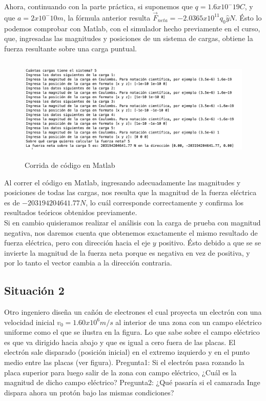 \documentclass[12pt, letterpaper]{report}
\begin{document}
Ahora, continuando con la parte práctica, si suponemos que $q = 1.6x10^-19 C$, y que $a = 2x10^-10m$, la fórmula anterior resulta $\vec{F}_{neta} = 
-2.0365x10^{11}q_0 \hat{y} N$. Ésto lo podemos comprobar con Matlab, con el simulador hecho previamente en el curso, que, ingresadas las magnitudes 
y posiciones de un sistema de cargas, obtiene la fuerza resultante sobre una carga puntual.\\
\begin{figure}[H]
    \centering
    \includegraphics[height = 5cm]{2024-04-27_MatlabEArg1.png}
    \caption{Corrida de código en Matlab}
\end{figure}Al correr el código en Matlab, ingresando adecuadamente las magnitudes y posiciones de todas las cargas, nos resulta que la magnitud de la fuerza eléctrica 
es de $-203194204641.77N$, lo cuál corresponde correctamente y confirma los resultados teóricos obtenidos previamente. \\

Si en cambio quisieramos realizar el análisis con la carga de prueba con magnitud negativa, nos daremos cuenta que obtenemos exactamente el mismo resultado de fuerza eléctrica, 
pero con dirección hacia el eje $y$ positivo. Ésto debido a que se se invierte la magnitud de la fuerza neta porque es negativa en vez de positiva, y por lo tanto 
el vector cambia a la dirección contraria. 
\subsection*{Situación 2}
Otro ingeniero diseña un cañón de electrones el cual proyecta un electrón con una velocidad inicial $v_0=1.60x10^6 m/s$ al interior de una zona con un campo eléctrico uniforme como el que se ilustra en la figura. Lo que sabe sobre el campo eléctrico es que va dirigido hacia abajo y que es igual a cero fuera de las placas. El electrón sale disparado (posición inicial) en el extremo izquierdo y en el punto medio entre las placas (ver figura). 
Pregunta1: Si el electrón pasa rozando la placa superior para luego salir de la zona con campo eléctrico, ¿Cuál es la magnitud de dicho campo eléctrico? 
Pregunta2: ¿Qué pasaría si el camarada Inge dispara ahora un protón bajo las mismas condiciones?\\ 
\end{document}
